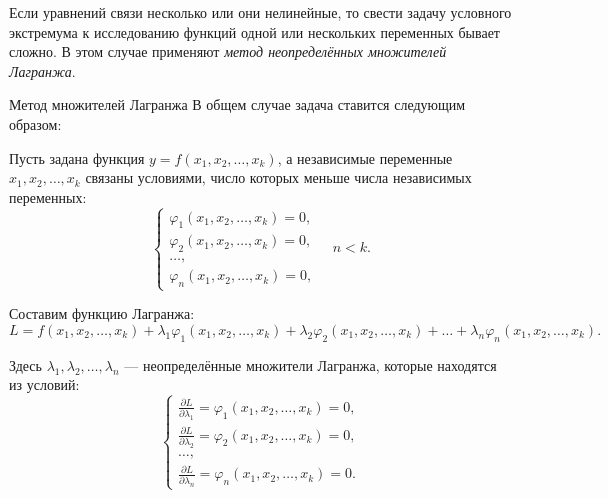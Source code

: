 Если уравнений связи несколько или они нелинейные, то свести задачу условного экстремума к исследованию функций одной или нескольких переменных бывает сложно. В этом случае применяют \textit{метод неопределённых множителей Лагранжа}.

\begin{tbox}{Метод множителей Лагранжа}
	В общем случае задача ставится следующим образом:

	Пусть задана функция $y = f(x_1, x_2, \dots, x_k)$, а независимые переменные $x_1, x_2, \dots, x_k$ связаны условиями, число которых меньше числа независимых переменных:
	\begin{equation} \label{eq:8.1}
		\begin{cases}
			\varphi_1(x_1, x_2, \dots, x_k) = 0, \\
			\varphi_2(x_1, x_2, \dots, x_k) = 0, \\
			\dots, \\
			\varphi_n(x_1, x_2, \dots, x_k) = 0,
		\end{cases}
		\quad n < k.
	\end{equation}

	Составим функцию Лагранжа:
	\begin{equation} \label{eq:8.2}
		L = f(x_1, x_2, \dots, x_k) + \lambda_1 \varphi_1(x_1, x_2, \dots, x_k) + \lambda_2 \varphi_2(x_1, x_2, \dots, x_k) + \dots + \lambda_n \varphi_n(x_1, x_2, \dots, x_k).
	\end{equation}

	Здесь $\lambda_1, \lambda_2, \dots, \lambda_n$ — неопределённые множители Лагранжа, которые находятся из условий:
	\begin{equation*}
		\begin{cases}
			\frac{\partial L}{\partial \lambda_1} = \varphi_1(x_1, x_2, \dots, x_k) = 0, \\
			\frac{\partial L}{\partial \lambda_2} = \varphi_2(x_1, x_2, \dots, x_k) = 0, \\
			\dots, \\
			\frac{\partial L}{\partial \lambda_n} = \varphi_n(x_1, x_2, \dots, x_k) = 0.
		\end{cases}
	\end{equation*}


\end{tbox}
